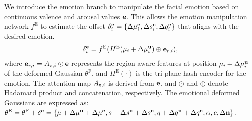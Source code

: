 We introduce the emotion branch to manipulate the facial emotion based on continuous valence and arousal values $\mathbf{e}$. This allows the emotion manipulation network $f^\text{E}$ to estimate the offset $\delta^{\mathbf{e}}_i = \{ \Delta \mu^{\mathbf{e}}_i, \Delta s^{\mathbf{e}}_i, \Delta q^{\mathbf{e}}_i \}$ that aligns with the desired emotion.
\begin{eqnarray}
    \delta^{\mathbf{e}}_i = f^\text{E}(H^\text{E}(\mu_i+\Delta \mu^{\mathbf{u}}_i) \oplus \mathbf{e}_{r,i}),
    \label{eq:emotion mlp}
\end{eqnarray}
where $\mathbf{e}_{r,i}=A_{\mathbf{e},i} \odot \mathbf{e}$ represents the region-aware features at position $\mu_i+\Delta \mu^{\mathbf{u}}_i$ of the deformed Gaussian $\theta^\text{F}$, and $H^\text{E}(\cdot)$ is the tri-plane hash encoder for the emotion. The attention map $A_{\mathbf{e}, i}$ is derived from $\mathbf{e}$, and $\odot$ and $\oplus$ denote Hadamard product and concatenation, respectively. The emotional deformed Gaussians are expressed as: $\theta^\text{E}=\theta^\text{F} + \delta^{\mathbf{e}}=\{\mu+\Delta \mu^{\mathbf{u}}+\Delta \mu^{\mathbf{e}}, s+\Delta s^{\mathbf{u}}+\Delta s^{\mathbf{e}}, q+\Delta q^{\mathbf{u}}+\Delta q^{\mathbf{e}}, \alpha, c, \Delta \mathbf{n} \}$.


